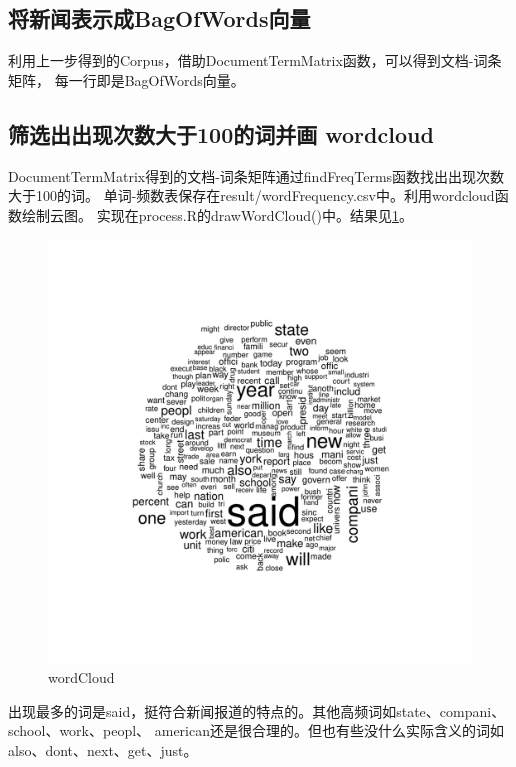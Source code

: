 \documentclass[12pt]{article}
\begin{document}
\subsection{将新闻表示成BagOfWords向量}
利用上一步得到的Corpus，借助DocumentTermMatrix函数，可以得到文档-词条矩阵，
每一行即是BagOfWords向量。
\subsection{筛选出出现次数大于100的词并画 wordcloud}
DocumentTermMatrix得到的文档-词条矩阵通过findFreqTerms函数找出出现次数大于100的词。
单词-频数表保存在result/wordFrequency.csv中。利用wordcloud函数绘制云图。
实现在process.R的drawWordCloud()中。结果见\ref{fig:wordCloud}。
\begin{figure}[htbp]
\centering
\includegraphics[width=1.0\textwidth]{../result/wordCloud.pdf}
\caption{wordCloud}
\label{fig:wordCloud}
\end{figure}
出现最多的词是said，挺符合新闻报道的特点的。其他高频词如state、compani、school、work、peopl、
american还是很合理的。但也有些没什么实际含义的词如also、dont、next、get、just。
\end{document}
